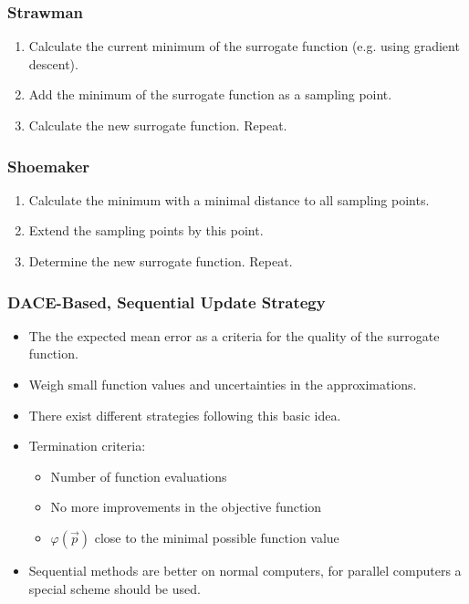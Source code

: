 			\subsubsection{Strawman}
				\begin{enumerate}
					\item Calculate the current minimum of the surrogate function (e.g. using gradient descent).
					\item Add the minimum of the surrogate function as a sampling point.
					\item Calculate the new surrogate function. Repeat.
				\end{enumerate}

			\subsubsection{Shoemaker}
				\begin{enumerate}
					\item Calculate the minimum with a minimal distance to all sampling points.
					\item Extend the sampling points by this point.
					\item Determine the new surrogate function. Repeat.
				\end{enumerate}

			\subsubsection{DACE-Based, Sequential Update Strategy}
				\begin{itemize}
					\item The the expected mean error as a criteria for the quality of the surrogate function.
					\item Weigh small function values and uncertainties in the approximations.
					\item There exist different strategies following this basic idea.
					\item Termination criteria:
						\begin{itemize}
							\item Number of function evaluations
							\item No more improvements in the objective function
							\item \(\varphi(\vec{p})\) close to the minimal possible function value
						\end{itemize}
					\item Sequential methods are better on normal computers, for parallel computers a special scheme should be used.
				\end{itemize}

